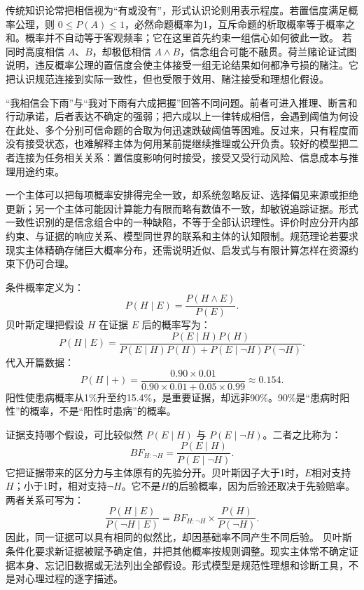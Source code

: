 传统知识论常把相信视为“有或没有”，形式认识论则用表示程度。若置信度满足概率公理，则 $0\leq P(A)\leq1$，必然命题概率为1，互斥命题的析取概率等于概率之和。概率并不自动等于客观频率；它在这里首先约束一组信心如何彼此一致。 若同时高度相信 $A$、$B$，却极低相信 $A\land B$，信念组合可能不融贯。荷兰赌论证试图说明，违反概率公理的置信度会使主体接受一组无论结果如何都净亏损的赌注。它把认识规范连接到实际一致性，但也受限于效用、赌注接受和理想化假设\parencite{joyce1998}。

“我相信会下雨”与“我对下雨有六成把握”回答不同问题。前者可进入推理、断言和行动承诺，后者表达不确定的强弱；把六成以上一律转成相信，会遇到阈值为何设在此处、多个分别可信命题的合取为何迅速跌破阈值等困难。反过来，只有程度而没有接受状态，也难解释主体为何用某前提继续推理或公开负责。较好的模型把二者连接为任务相关关系：置信度影响何时接受，接受又受行动风险、信息成本与推理用途约束。

一个主体可以把每项概率安排得完全一致，却系统忽略反证、选择偏见来源或拒绝更新；另一个主体可能因计算能力有限而略有数值不一致，却敏锐追踪证据。形式一致性识别的是信念组合中的一种缺陷，不等于全部认识理性。评价时应分开内部约束、与证据的响应关系、模型同世界的联系和主体的认知限制。规范理论若要求现实主体精确存储巨大概率分布，还需说明近似、启发式与有限计算怎样在资源约束下仍可合理。

条件概率定义为：
\[
P(H\mid E)=\frac{P(H\land E)}{P(E)}.
\]
贝叶斯定理把假设 $H$ 在证据 $E$ 后的概率写为：
\[
P(H\mid E)=\frac{P(E\mid H)P(H)}{P(E\mid H)P(H)+P(E\mid\neg H)P(\neg H)}.
\]
代入开篇数据：
\[
P(H\mid +)=\frac{0.90\times0.01}{0.90\times0.01+0.05\times0.99}\approx0.154.
\]
阳性使患病概率从1\%升至约15.4\%，是重要证据，却远非90\%。90\%是“患病时阳性”的概率，不是“阳性时患病”的概率。

证据支持哪个假设，可比较似然 $P(E\mid H)$ 与 $P(E\mid\neg H)$。二者之比称为：
\[
BF_{H:\neg H}=\frac{P(E\mid H)}{P(E\mid\neg H)}.
\]
它把证据带来的区分力与主体原有的先验分开。贝叶斯因子大于1时，$E$相对支持$H$；小于1时，相对支持$\neg H$。它不是$H$的后验概率，因为后验还取决于先验赔率。两者关系可写为：
\[
\frac{P(H\mid E)}{P(\neg H\mid E)}
=
BF_{H:\neg H}\times\frac{P(H)}{P(\neg H)}.
\]
因此，同一证据可以具有相同的似然比，却因基础率不同产生不同后验。 贝叶斯条件化要求新证据被赋予确定值，并把其他概率按规则调整。现实主体常不确定证据本身、忘记旧数据或无法列出全部假设。形式模型是规范性理想和诊断工具，不是对心理过程的逐字描述\parencite{howson2006}。

